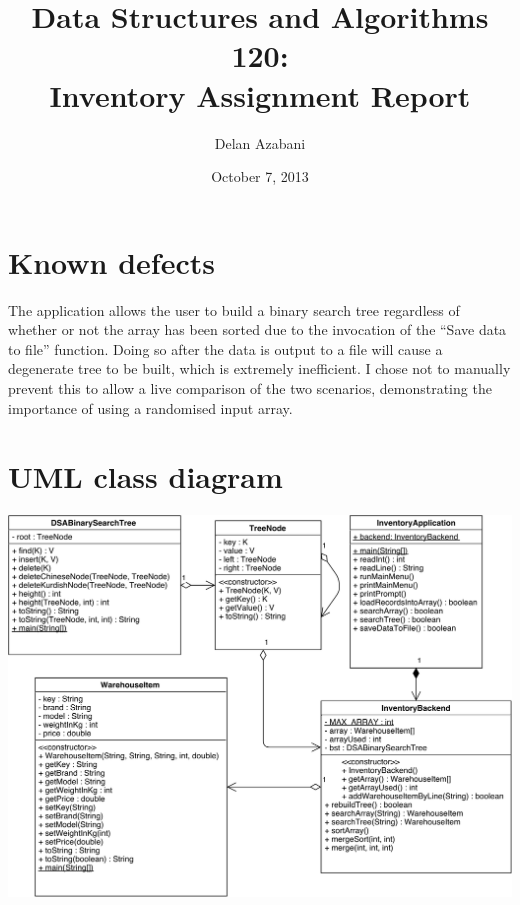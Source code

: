 \documentclass[a4paper,12pt]{article}
\title{Data Structures and Algorithms 120:\\Inventory Assignment Report}
\date{October 7, 2013}
\author{Delan Azabani}
\begin{document}
\maketitle


\section{Known defects}

The application allows the user to build a binary search tree regardless of
whether or not the array has been sorted due to the invocation of the ``Save
data to file'' function. Doing so after the data is output to a file will cause
a degenerate tree to be built, which is extremely inefficient. I chose not to
manually prevent this to allow a live comparison of the two scenarios,
demonstrating the importance of using a randomised input array.

\section{UML class diagram}

\includegraphics[width=15cm]{umldiagram.png}
\end{document}
